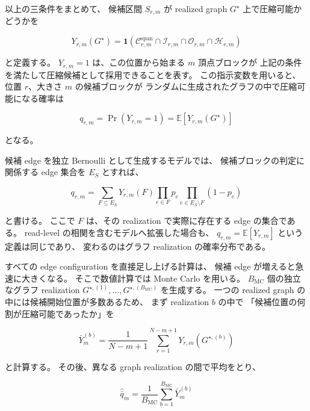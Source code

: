 \documentclass[a4j,10pt]{ujarticle}
\begin{document}
以上の三条件をまとめて、
候補区間 $S_{r,m}$ が realized graph $G^\star$ 上で圧縮可能かどうかを

\begin{equation}
Y_{r,m}(G^\star)
=
\mathbf 1\!\left(
\mathcal C^{\mathrm{span}}_{r,m}
\cap
\mathcal I_{r,m}
\cap
\mathcal O_{r,m}
\cap
\mathcal H_{r,m}
\right)
\label{eq:block_indicator_ch5}
\end{equation}

と定義する。
$Y_{r,m}=1$ は、この位置から始まる $m$ 頂点ブロックが
上記の条件を満たして圧縮候補として採用できることを表す。
この指示変数を用いると、
位置 $r$、大きさ $m$ の候補ブロックが
ランダムに生成されたグラフの中で圧縮可能になる確率は

\begin{equation}
q_{r,m}
=
\Pr(Y_{r,m}=1)
=
\mathbb E[Y_{r,m}(G^\star)]
\label{eq:q_block_ch5}
\end{equation}

となる。

候補 edge を独立 Bernoulli として生成するモデルでは、
候補ブロックの判定に関係する edge 集合を $E_S$ とすれば、

\[
q_{r,m}
=
\sum_{F\subseteq E_S}
Y_{r,m}(F)
\prod_{e\in F}p_e
\prod_{e\in E_S\setminus F}(1-p_e)
\]

と書ける。
ここで $F$ は、その realization で実際に存在する edge の集合である。
read-level の相関を含むモデルへ拡張した場合も、
$q_{r,m}=\mathbb E[Y_{r,m}]$ という定義は同じであり、
変わるのはグラフ realization の確率分布である。

すべての edge configuration を直接足し上げる計算は、
候補 edge が増えると急速に大きくなる。
そこで数値計算では Monte Carlo を用いる。
$B_{\mathrm{MC}}$ 個の独立なグラフ realization
$G^{\star,(1)},\ldots,G^{\star,(B_{\mathrm{MC}})}$ を生成する。
一つの realized graph の中には候補開始位置が多数あるため、
まず realization $b$ の中で
「候補位置の何割が圧縮可能であったか」を

\begin{equation}
\bar Y_m^{(b)}
=
\frac{1}{N-m+1}
\sum_{r=1}^{N-m+1}
Y_{r,m}(G^{\star,(b)})
\label{eq:Ybar_ch5}
\end{equation}

と計算する。
その後、異なる graph realization の間で平均をとり、

\begin{equation}
\widehat{\bar q}_m
=
\frac{1}{B_{\mathrm{MC}}}
\sum_{b=1}^{B_{\mathrm{MC}}}
\bar Y_m^{(b)}
\label{eq:qbar_ch5}\end{equation}
\end{document}
